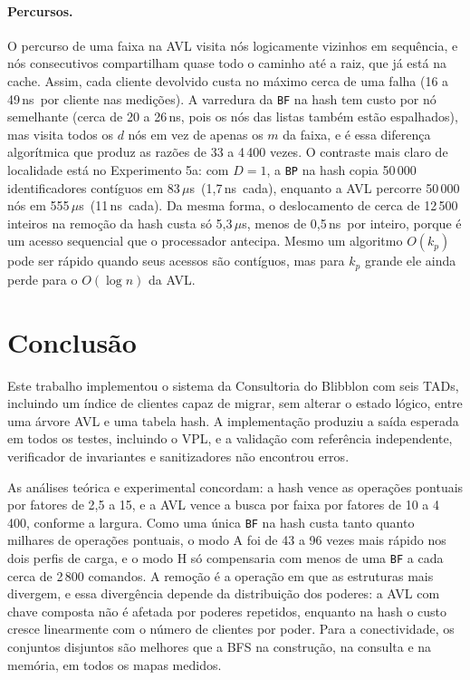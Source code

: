 \documentclass[letterpaper]{article} %
\newcommand{\ns}{\,ns}
\newcommand{\us}{\,$\mu$s}
\begin{document}
\paragraph{Percursos.} O percurso de uma faixa na AVL visita n\'os logicamente vizinhos em sequ\^encia, e n\'os consecutivos compartilham quase todo o caminho at\'e a raiz, que j\'a est\'a na cache. Assim, cada cliente devolvido custa no m\'aximo cerca de uma falha (16 a 49\ns\ por cliente nas medi\c{c}\~oes). A varredura da \texttt{BF} na hash tem custo por n\'o semelhante (cerca de 20 a 26\ns, pois os n\'os das listas tamb\'em est\~ao espalhados), mas visita todos os $d$ n\'os em vez de apenas os $m$ da faixa, e \'e essa diferen\c{c}a algor\'itmica que produz as raz\~oes de 33 a 4\,400 vezes. O contraste mais claro de localidade est\'a no Experimento 5a: com $D = 1$, a \texttt{BP} na hash copia 50\,000 identificadores cont\'iguos em 83\us\ (1,7\ns\ cada), enquanto a AVL percorre 50\,000 n\'os em 555\us\ (11\ns\ cada). Da mesma forma, o deslocamento de cerca de 12\,500 inteiros na remo\c{c}\~ao da hash custa s\'o 5,3\us, menos de 0,5\ns\ por inteiro, porque \'e um acesso sequencial que o processador antecipa. Mesmo um algoritmo $O(k_p)$ pode ser r\'apido quando seus acessos s\~ao cont\'iguos, mas para $k_p$ grande ele ainda perde para o $O(\log n)$ da AVL.

\section{Conclus\~ao}

Este trabalho implementou o sistema da Consultoria do Blibblon com seis TADs, incluindo um \'indice de clientes capaz de migrar, sem alterar o estado l\'ogico, entre uma \'arvore AVL e uma tabela hash. A implementa\c{c}\~ao produziu a sa\'ida esperada em todos os testes, incluindo o VPL, e a valida\c{c}\~ao com refer\^encia independente, verificador de invariantes e sanitizadores n\~ao encontrou erros.

As an\'alises te\'orica e experimental concordam: a hash vence as opera\c{c}\~oes pontuais por fatores de 2,5 a 15, e a AVL vence a busca por faixa por fatores de 10 a 4\,400, conforme a largura. Como uma \'unica \texttt{BF} na hash custa tanto quanto milhares de opera\c{c}\~oes pontuais, o modo A foi de 43 a 96 vezes mais r\'apido nos dois perfis de carga, e o modo H s\'o compensaria com menos de uma \texttt{BF} a cada cerca de 2\,800 comandos. A remo\c{c}\~ao \'e a opera\c{c}\~ao em que as estruturas mais divergem, e essa diverg\^encia depende da distribui\c{c}\~ao dos poderes: a AVL com chave composta n\~ao \'e afetada por poderes repetidos, enquanto na hash o custo cresce linearmente com o n\'umero de clientes por poder. Para a conectividade, os conjuntos disjuntos s\~ao melhores que a BFS na constru\c{c}\~ao, na consulta e na mem\'oria, em todos os mapas medidos.
\end{document}
